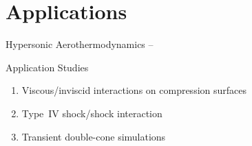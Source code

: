 \documentclass[compress,11pt]{beamer}
\begin{document}
\section{Applications}
\frame
{
  \vspace{2em}
  \centerline{\huge{Hypersonic Aerothermodynamics -- }}
  \vspace{.5em}
  
  \centerline{\huge{ Application Studies}}
  \vspace{4em}
  
  \begin{enumerate}
    \item Viscous/inviscid interactions on compression surfaces
    \item Type~IV shock/shock interaction
    \item Transient double-cone simulations
  \end{enumerate}
}
\end{document}
